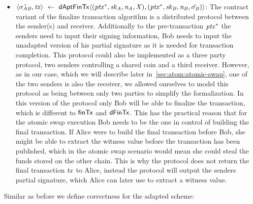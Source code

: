 \begin{definition}
\begin{itemize}
        \item $\langle \tilde{\sigma_{\mathit{A}\mathit{B}}}, \mathit{tx} \rangle ~\leftarrow~ \mathsf{dAptFinTx} \langle (\mathit{ptx}^*,\mathit{sk}_{\mathit{A}},\mathit{\mathit{n}_{\mathit{A}}},\mathit{X}), (\mathit{ptx}^*,\mathit{sk}_{\mathit{B}},\mathit{\mathit{n}_{\mathit{B}}},\tilde{\sigma_{\mathit{B}}}) \rangle$: The contract variant of the finalize transaction algorithm is a distributed protocol between the sender(s) and receiver.
        Additionally to the pre-transaction $\mathit{ptx}^*$ the senders need to input their signing information, Bob needs to input the unadapted version of his partial signature as it is needed for transaction completion.
        This protocol could also be implemented as a three party protocol, two senders controlling a shared coin and a third receiver.
        However, as in our case, which we will describe later in~\cref{sec:atom:atomic-swap}, one of the two senders is also the receiver, we allowed ourselves to model this protocol as being between only two parties to simplify the formalization.
        In this version of the protocol only Bob will be able to finalize the transaction, which is different to $\mathsf{finTx}$ and $\mathsf{dFinTx}$.
        This has the practical reason that for the atomic swap execution Bob needs to be the one in control of building the final transaction.
        If Alice were to build the final transaction before Bob, she might be able to extract the witness value before the transaction has been published, which in the atomic swap scenario would mean she could steal the funds stored on the other chain.
        This is why the protocol does not return the final transaction $\mathit{tx}$ to Alice, instead the protocol will output the senders partial signature, which Alice can later use to extract a witness value.
    \end{itemize}
\end{definition}

Similar as before we define correctness for the adapted scheme:

